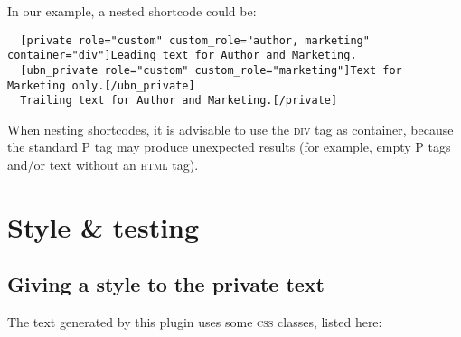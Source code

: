 In our example, a nested shortcode could be:

\begin{lstlisting}
  [private role="custom" custom_role="author, marketing" container="div"]Leading text for Author and Marketing.
  [ubn_private role="custom" custom_role="marketing"]Text for Marketing only.[/ubn_private]
  Trailing text for Author and Marketing.[/private]
\end{lstlisting}

When nesting shortcodes,  it is advisable to use the \textsc{div} tag as container, because
the standard P tag may produce unexpected results (for example, empty P tags
and/or text without an \textsc{html} tag).

\part{Style \& testing}

\chapter{Giving a style to the private text}

The text generated by this plugin uses some \textsc{css} classes, listed here:

